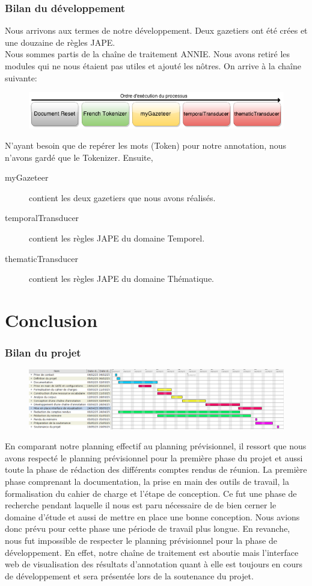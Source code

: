 \documentclass[a4paper, 11pt]{report}
\begin{document}
\section{Bilan du développement}
Nous arrivons aux termes de notre développement. Deux gazetiers ont été crées et une douzaine de règles JAPE.\\
Nous sommes partis de la chaîne de traitement ANNIE. Nous avons retiré les modules qui ne nous étaient pas utiles et ajouté les nôtres. On arrive à la chaîne suivante:
\begin{figure}[H]
\centering
\includegraphics[scale=.5]{img/notreChaine.png}
\end{figure}
N'ayant besoin que de repérer les mots (Token) pour notre annotation, nous n'avons gardé que le Tokenizer. Ensuite, 
\begin{description}
\item[myGazeteer] contient les deux gazetiers que nous avons réalisés.
\item[temporalTransducer] contient les règles JAPE du domaine Temporel.
\item[thematicTransducer] contient les règles JAPE du domaine Thématique.
\end{description}
\part{Conclusion}
\section{Bilan du projet}
\begin{figure}[hbtp]
\includegraphics[scale=.3]{img/ganttEff.png}
\end{figure}
En comparant notre planning effectif au planning prévisionnel, il ressort que nous avons respecté le planning prévisionnel pour la première phase du projet et aussi toute la phase de rédaction des différents comptes rendus de réunion. La première phase comprenant la documentation, la prise en main des outils de travail, la formalisation du cahier de charge et l'étape de conception. Ce fut une phase de recherche pendant laquelle il nous est paru nécessaire de de bien cerner le domaine d'étude et aussi de mettre en place une bonne conception. Nous avions donc prévu pour cette phase une période de travail plus longue. En revanche, nous fut impossible de respecter le planning prévisionnel pour la phase de développement. En effet, notre chaîne de traitement est aboutie mais l'interface web de visualisation des résultats d'annotation quant à elle est toujours en cours de développement et sera présentée lors de la soutenance du projet.
\end{document}
